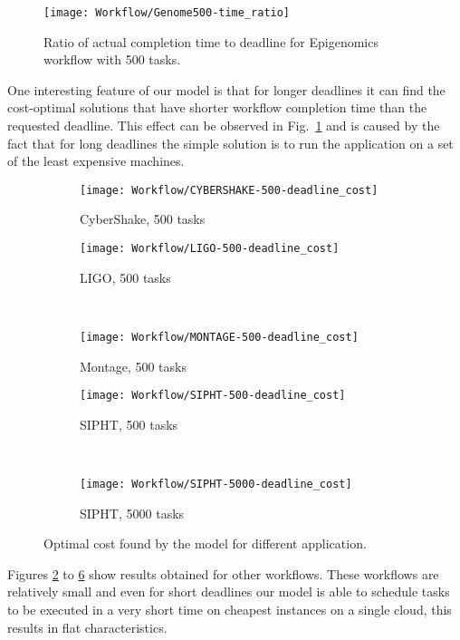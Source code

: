 {    \begin{figure}[tb]
       \centering \texttt{[image: Workflow/Genome500-time\_ratio]}
       \caption{Ratio of actual completion time to deadline for Epigenomics workflow with 500 tasks.
       \label{fig:workflow:genome-500-ratio}}
    \end{figure}
    
    One interesting feature of our model is that for longer deadlines it can find the cost-optimal solutions that have shorter workflow completion time than the requested deadline. This effect can be observed in Fig.~\ref{fig:workflow:genome-500-ratio} and is caused by the fact that for long deadlines the simple solution is to run the application on a set of the least expensive machines. 
    
    \begin{figure}[tb] 
       \centering       
       \begin{subfigure}[b]{0.49\textwidth}  
         \texttt{[image: Workflow/CYBERSHAKE-500-deadline\_cost]}
         \caption{CyberShake, 500 tasks}
         \label{fig:workflow:cybershake-500}
       \end{subfigure}
      \begin{subfigure}[b]{0.49\textwidth}  
        \texttt{[image: Workflow/LIGO-500-deadline\_cost]}
        \caption{LIGO, 500 tasks}
        \label{fig:workflow:ligo-500}
      \end{subfigure} \\ 
      \begin{subfigure}[b]{0.49\textwidth}  
        \texttt{[image: Workflow/MONTAGE-500-deadline\_cost]}
        \caption{Montage, 500 tasks}
        \label{fig:workflow:montage-500}
      \end{subfigure}             
      \begin{subfigure}[b]{0.49\textwidth}  
        \texttt{[image: Workflow/SIPHT-500-deadline\_cost]}
        \caption{SIPHT, 500 tasks}
        \label{fig:workflow:sipht-500}
      \end{subfigure}\\
      \begin{subfigure}[b]{0.49\textwidth}  
        \texttt{[image: Workflow/SIPHT-5000-deadline\_cost]}
        \caption{SIPHT, 5000 tasks}
        \label{fig:workflow:sipht-5000}
      \end{subfigure}
      \caption{\label{fig:other}Optimal cost found by the model for different application.}
    \end{figure}  
    Figures \ref{fig:workflow:cybershake-500} to \ref{fig:workflow:sipht-5000}  show results obtained for other workflows. These workflows are relatively small and even for short deadlines our model is able to schedule tasks to be executed in a very short time on cheapest instances on a single cloud, this results in flat characteristics.
    
}
